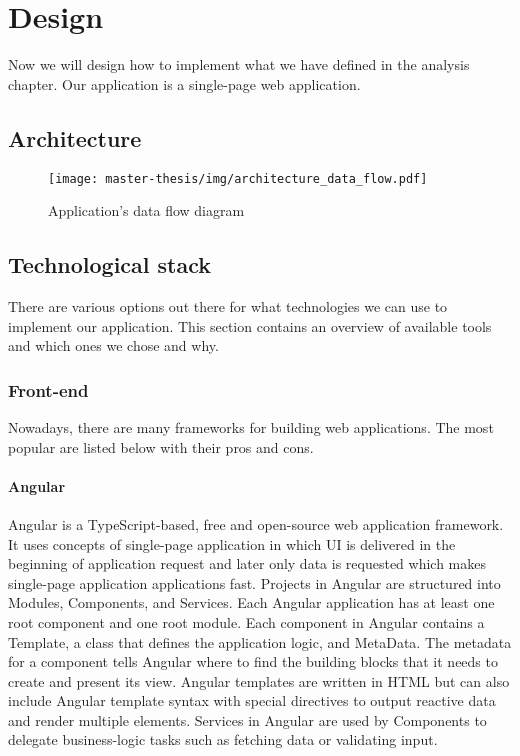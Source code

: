 \chapter{Design}
Now we will design how to implement what we have defined in the analysis chapter.
Our application is a single-page web application.

\section{Architecture}
\begin{figure}[h]
  \centering
  \texttt{[image: master-thesis/img/architecture\_data\_flow.pdf]}
  \caption{Application's data flow diagram}
\end{figure}

\section{Technological stack}
There are various options out there for what technologies we can use to implement our application.
This section contains an overview of available tools and which ones we chose and why.

\subsection{Front-end}
Nowadays, there are many frameworks for building web applications.
The most popular are listed below with their pros and cons.

\subsubsection*{Angular}
Angular is a TypeScript-based, free and open-source web application framework.
It uses concepts of single-page application in which UI is delivered in the beginning of application request and later only data is requested which makes single-page application applications fast.
Projects in Angular are structured into Modules, Components, and Services. 
Each Angular application has at least one root component and one root module.
Each component in Angular contains a Template, a class that defines the application logic, and MetaData. 
The metadata for a component tells Angular where to find the building blocks that it needs to create and present its view.
Angular templates are written in HTML but can also include Angular template syntax with special directives to output reactive data and render multiple elements.
Services in Angular are used by Components to delegate business-logic tasks such as fetching data or validating input.

